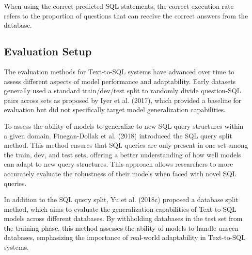 When using the correct predicted SQL statements, the correct execution rate refers to the proportion of questions that can receive the correct answers from the database.




\subsection*{Evaluation Setup}

The evaluation methods for Text-to-SQL systems have advanced over time to assess different aspects of model performance and adaptability. Early datasets generally used a standard train/dev/test split to randomly divide question-SQL pairs across sets as proposed by Iyer et al. (2017), which provided a baseline for evaluation but did not specifically target model generalization capabilities.

To assess the ability of models to generalize to new SQL query structures within a given domain, Finegan-Dollak et al. (2018) introduced the SQL query split method. This method ensures that SQL queries are only present in one set among the train, dev, and test sets, offering a better understanding of how well models can adapt to new query structures. This approach allows researchers to more accurately evaluate the robustness of their models when faced with novel SQL queries.

In addition to the SQL query split, Yu et al. (2018c) proposed a database split method, which aims to evaluate the generalization capabilities of Text-to-SQL models across different databases. By withholding databases in the test set from the training phase, this method assesses the ability of models to handle unseen databases, emphasizing the importance of real-world adaptability in Text-to-SQL systems.

